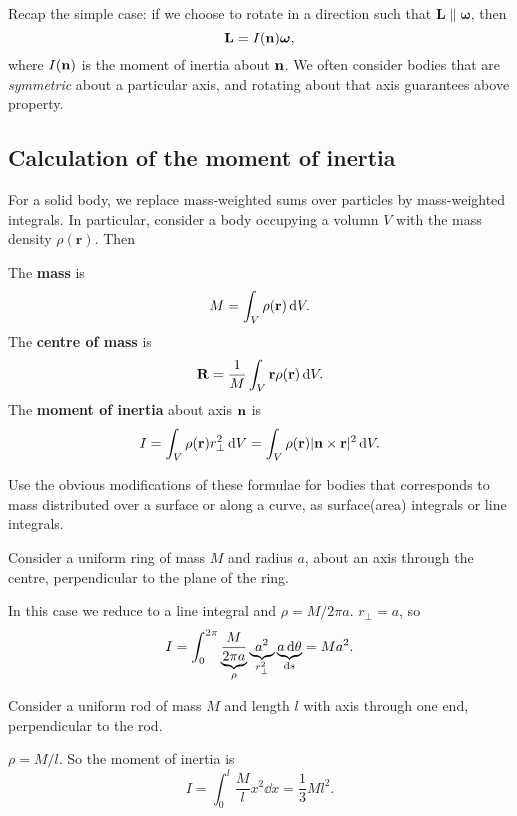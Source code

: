 Recap the simple case: if we choose to rotate in a direction such that $ \mathbf{L}\parallel \boldsymbol\omega $, then 
\[
    {\bf L} = I({\bf n}) \boldsymbol{\omega},
\]
where $ I({\bf n}) $ is the moment of inertia about ${\bf n}$. We often consider bodies that are \textit{symmetric} about a particular axis, and rotating about that axis guarantees above property. 

\subsection{Calculation of the moment of inertia}
For a solid body, we replace mass-weighted sums over particles by mass-weighted integrals. In particular, consider a body occupying a volumn $V$ with the mass density $\rho(\mathbf{r})$. Then 
\begin{definition}
    The \textbf{mass} is
    \[
      M = \int_V \rho(\mathbf{r}) \,\mathrm{d} V.
    \]
    The \textbf{centre of mass} is
    \[
      \mathbf{R} = \frac{1}{M}\int_V \mathbf{r}\rho(\mathbf{r})\,\mathrm{d} V.
    \]
    The \textbf{moment of inertia} about axis ${\bf n}$ is
    \[
      I = \int_V \rho(\mathbf{r}) r_{\perp}^2 \,\mathrm{d} V = \int_V \rho(\mathbf{r})|\mathbf{n}\times \mathbf{r}|^2\,\mathrm{d} V.
    \]
\end{definition}
Use the obvious modifications of these formulae for bodies that corresponds to mass distributed over a surface or along a curve, as surface(area) integrals or line integrals.

\begin{example}
    Consider a uniform ring of mass $M$ and radius $a$, about an axis through the centre, perpendicular to the plane of the ring.
    \begin{center}
    \end{center}
    In this case we reduce to a line integral and $ \rho = M/2\pi a $. $ r_{\perp }=a $, so 
    \[
      I = \int_{0}^{2\pi} \underbrace{\frac{M}{2\pi a}}_{\rho} \underbrace{a^2}_{r_{\perp}^2} \underbrace{a \,\mathrm{d} \theta}_{\mathrm{d} s}= Ma^2.
    \]
\end{example}

\begin{example}
    Consider a uniform rod of mass $M$ and length $l$ with axis through one end, perpendicular to the rod.
    \begin{center}
    \end{center}
    $\rho = M/l$. So the moment of inertia is
    \[
      I = \int_0 ^l \frac{M}{l}x^2\dd x = \frac{1}{3}Ml^2.
    \]
\end{example}

